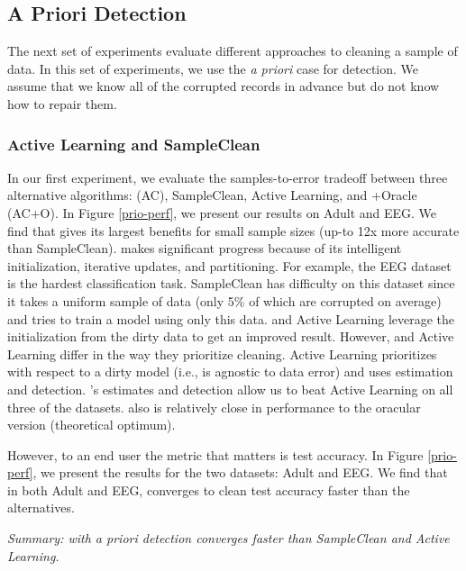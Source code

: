 \subsection{\sys A Priori Detection}
The next set of experiments evaluate different approaches to cleaning a sample of data.
In this set of experiments, we use the \emph{a priori} case for detection.
We assume that we know all of the corrupted records in advance but do not know how to repair them. 

\subsubsection{Active Learning and SampleClean}
In our first experiment, we evaluate the samples-to-error tradeoff between three alternative algorithms: \sys (AC), SampleClean, Active Learning, and \sys+Oracle (AC+O).
In Figure \ref{prio-perf}, we present our results on Adult and EEG. 
We find that \sys gives its largest benefits for small sample sizes (up-to 12x more accurate than SampleClean).
\sys makes significant progress because of its intelligent initialization, iterative updates, and partitioning.
For example, the EEG dataset is the hardest classification task.
SampleClean has difficulty on this dataset since it takes a uniform sample of data (only 5\% of which are corrupted on average) and tries to train a model using only this data.
\sys and Active Learning leverage the initialization from the dirty data to get an improved result. 
However, \sys and Active Learning differ in the way they prioritize cleaning.
Active Learning prioritizes with respect to a dirty model (i.e., is agnostic to data error) and \sys uses estimation and detection.
\sys's estimates and detection allow us to beat Active Learning on all three of the datasets.
\sys also is relatively close in performance to the oracular version (theoretical optimum).

However, to an end user the metric that matters is test accuracy.
In Figure \ref{prio-perf}, we present the results for the two datasets: Adult and EEG.
We find that in both Adult and EEG, \sys converges to clean test accuracy faster than the alternatives.

\vspace{0.25em}

\noindent \emph{Summary: \sys with a priori detection converges faster than SampleClean and Active Learning.}

